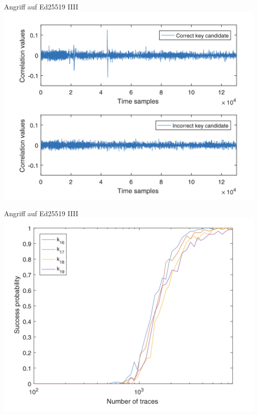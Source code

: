 \documentclass[
  11 pt,
  ignorenonframetext,
  aspectratio=43,
]{beamer}
\begin{document}
\begin{frame}{Angriff auf Ed25519 IIII}
\protect\hypertarget{angriff-auf-ed25519-iiii}{}
\includegraphics[width=\textwidth,height=0.95\textheight]{Abbildungen/cvDPA.png}
\end{frame}

\begin{frame}{Angriff auf Ed25519 IIII}
\protect\hypertarget{angriff-auf-ed25519-iiii-1}{}
\includegraphics[width=\textwidth,height=0.95\textheight]{Abbildungen/Erfolg.png}
\end{frame}
\end{document}

